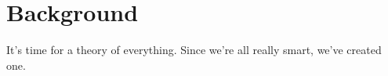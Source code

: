 \section{Background}
It's time for a theory of everything.  Since we're all really smart, we've created one.

